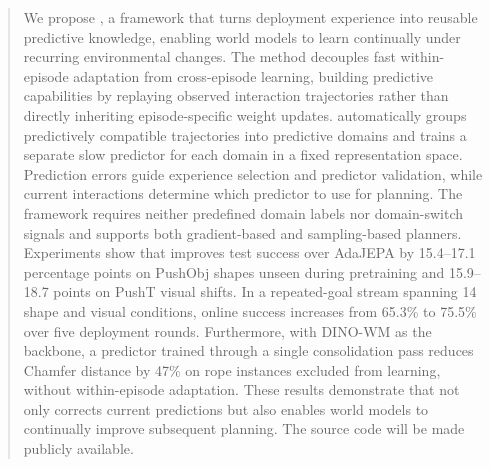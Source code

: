 \begin{abstract}
We propose \ours{}, a framework that turns deployment experience into reusable predictive knowledge, enabling world models to learn continually under recurring environmental changes. The method decouples fast within-episode adaptation from cross-episode learning, building predictive capabilities by replaying observed interaction trajectories rather than directly inheriting episode-specific weight updates. \ours{} automatically groups predictively compatible trajectories into predictive domains and trains a separate slow predictor for each domain in a fixed representation space. Prediction errors guide experience selection and predictor validation, while current interactions determine which predictor to use for planning. The framework requires neither predefined domain labels nor domain-switch signals and supports both gradient-based and sampling-based planners. Experiments show that \ours{} improves test success over AdaJEPA by 15.4--17.1 percentage points on PushObj shapes unseen during pretraining and 15.9--18.7 points on PushT visual shifts. In a repeated-goal stream spanning 14 shape and visual conditions, online success increases from 65.3\% to 75.5\% over five deployment rounds. Furthermore, with DINO-WM as the backbone, a predictor trained through a single consolidation pass reduces Chamfer distance by 47\% on rope instances excluded from learning, without within-episode adaptation. These results demonstrate that \ours{} not only corrects current predictions but also enables world models to continually improve subsequent planning. The source code will be made publicly available.

\end{abstract}
